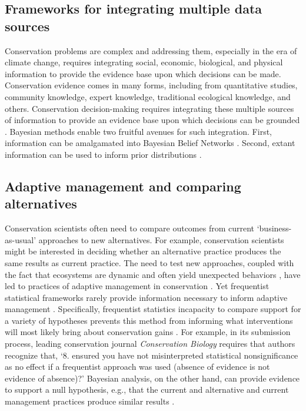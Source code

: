 \documentclass{article}
\begin{document}
\subsection*{Frameworks for integrating multiple data sources}
\par Conservation problems are complex and addressing them, especially in the era of climate change, requires integrating social, economic, biological, and physical information to provide the evidence base upon which decisions can be made. Conservation evidence comes in many forms, including from quantitative studies, community knowledge, expert knowledge, traditional ecological knowledge, and others. Conservation decision-making requires integrating these multiple sources of information to provide an evidence base upon which decisions can be grounded \citep{stern2022interweaving}. Bayesian methods enable two fruitful avenues for such integration. First, information can be amalgamated into Bayesian Belief Networks \citep{marcot2001using,newton2007bayesian}. Second, extant information can be used to inform prior distributions \citep{o2008informed}. 

\subsection*{Adaptive management and comparing alternatives}
\par Conservation scientists often need to compare outcomes from current `business-as-usual' approaches to new alternatives. For example, conservation scientists might be interested in deciding whether an alternative practice produces the same results as current practice. 
The need to test new approaches, coupled with the fact that ecosystems are dynamic and often yield unexpected behaviors \citep{Levin2012,Gross2013}, have led to practices of adaptive management in conservation \citep{holling1978adaptive}. Yet frequentist statistical frameworks rarely provide information necessary to inform adaptive management  \citep{prato2005bayesian}.  Specifically, frequentist statistics incapacity to compare support for a variety of hypotheses \citep[including a `null' hypothesis;][]{Zyl2018} prevents this method from informing what interventions will most likely bring about conservation gains \citep{prato2005bayesian}. For example, in its submission process, leading conservation journal \textit{Conservation Biology} requires that authors recognize that, `8. ensured you have not misinterpreted statistical nonsignificance as no effect if a frequentist approach was used (absence of evidence is not evidence of absence)?' Bayesian analysis, on the other hand, can provide evidence to support a null hypothesis, e.g., that the current and alternative and current management practices produce similar results \citep{gallistel2009importance}.
\end{document}

